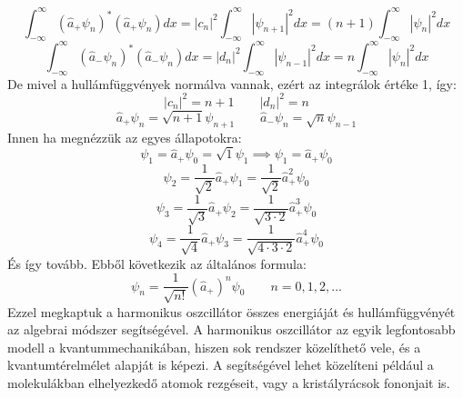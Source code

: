 \documentclass[../main.tex]{subfiles}
\begin{document}
\begin{equation}
    \int_{-\infty}^{\infty} (\hat{a}_+ \psi_n)^* (\hat{a}_+ \psi_n) dx = |c_n|^2 \int_{-\infty}^{\infty} |\psi_{n+1}|^2 dx = (n + 1) \int_{-\infty}^{\infty} |\psi_n|^2 dx
\end{equation}
\begin{equation}
    \int_{-\infty}^{\infty} (\hat{a}_- \psi_n)^* (\hat{a}_- \psi_n) dx = |d_n|^2 \int_{-\infty}^{\infty} |\psi_{n-1}|^2 dx = n \int_{-\infty}^{\infty} |\psi_n|^2 dx
\end{equation}
De mivel a hullámfüggvények normálva vannak, ezért az integrálok értéke 1, így:
\begin{equation}
    |c_n|^2 = n + 1 \quad \quad |d_n|^2 = n
\end{equation}
\begin{equation}
    \hat{a}_+ \psi_n = \sqrt{n + 1} \psi_{n+1} \quad \quad \hat{a}_- \psi_n = \sqrt{n} \psi_{n-1}
\end{equation}
Innen ha megnézzük az egyes állapotokra:
\begin{equation}
    \psi_1 = \hat{a}_+ \psi_0 = \sqrt{1} \psi_1 \implies \psi_1 = \hat{a}_+ \psi_0
\end{equation}
\begin{equation}
    \psi_2 = \frac{1}{\sqrt{2}} \hat{a}_+ \psi_1 = \frac{1}{\sqrt{2}} \hat{a}_+^2 \psi_0
\end{equation}
\begin{equation}
    \psi_3 = \frac{1}{\sqrt{3}} \hat{a}_+ \psi_2 = \frac{1}{\sqrt{3 \cdot 2}} \hat{a}_+^3 \psi_0
\end{equation}
\begin{equation}
    \psi_4 = \frac{1}{\sqrt{4}} \hat{a}_+ \psi_3 = \frac{1}{\sqrt{4 \cdot 3 \cdot 2}} \hat{a}_+^4 \psi_0
\end{equation}
És így tovább. Ebből következik az általános formula:
\begin{equation}
    \psi_n = \frac{1}{\sqrt{n!}} (\hat{a}_+)^n \psi_0 \quad \quad n = 0, 1, 2, \ldots
\end{equation}
Ezzel megkaptuk a harmonikus oszcillátor összes energiáját és hullámfüggvényét az algebrai módszer segítségével. A harmonikus oszcillátor
az egyik legfontosabb modell a kvantummechanikában, hiszen sok rendszer közelíthető vele, és a kvantumtérelmélet alapját is képezi. A segítségével
lehet közelíteni például a molekulákban elhelyezkedő atomok rezgéseit, vagy a kristályrácsok fononjait is.
\end{document}
